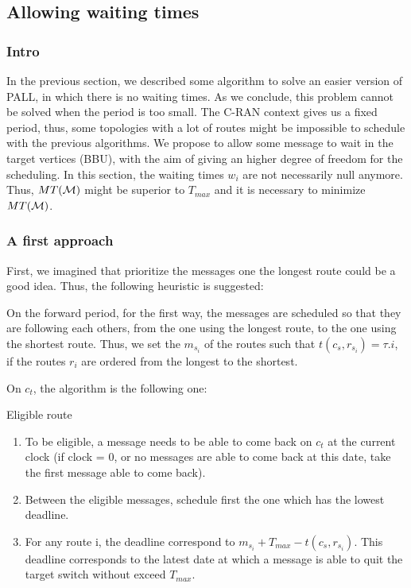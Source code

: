 \documentclass[a4paper,10pt]{article}
\begin{document}
   \subsection{Allowing waiting times}
    
     \subsubsection{Intro}
     
	  In the previous section, we described some algorithm to solve an easier version of PALL, in which there is no waiting times. As we conclude, this problem cannot be solved when the period is too small. The C-RAN context gives us a fixed period, thus, some topologies with a lot of routes might be impossible to schedule with the previous algorithms. We propose to allow some message to wait in the target vertices (BBU), with the aim of giving an higher degree of freedom for the scheduling. In this section, the waiting times $w_i$ are not necessarily null anymore. Thus, $MT({\cal M})$ might be superior to $T_{max}$ and it is necessary to minimize $MT({\cal M})$.
	   

% 
% 	

     \subsubsection{A first approach}
	  
      First, we imagined that prioritize the messages one the longest route could be a good idea. Thus, the following heuristic is suggested:

      On the forward period, for the first way, the messages are scheduled so that they are following each others, from the one using the longest route, to the one using the shortest route. Thus, we set the $m_{s_i}$ of the routes such that  $t(c_s,r_{s_i}) = \tau.i$, if the routes $r_i$ are ordered from the longest to the shortest.

      On $c_t$, the algorithm is the following one:


  \begin{algorithm}[H]

    \caption{Eligible route}
    \label{algorithm:Eligible}
    \begin{enumerate}
      
      \item To be eligible, a message needs to be able to come back on $c_t$ at the current clock (if clock = 0, or no messages are able to come back at this date, take the first message able to come back).
      \item Between the eligible messages, schedule first the one which has the lowest deadline.
      \item For any route i, the deadline correspond to $m_{s_i} + T_{max}-t(c_s,r_{s_i})$. This deadline corresponds to the latest date at which a message is able to quit the target switch without exceed $T_{max}$.

      \end{enumerate}
      
  \end{algorithm}
    
\end{document}
